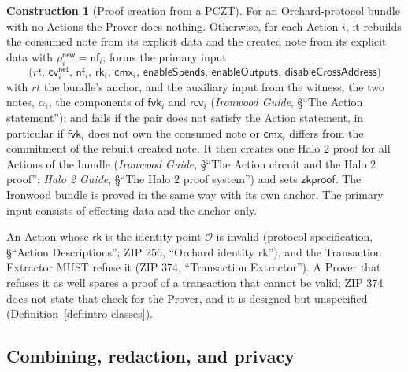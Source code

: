 \documentclass[11pt,a4paper]{article}
\theoremstyle{definition}
\newtheorem{construction}[theorem]{Construction}
\newcommand{\nfsym}{\mathsf{nf}}
\newcommand{\cmx}{\mathsf{cmx}}
\newcommand{\cvsym}{\mathsf{cv}}
\newcommand{\rk}{\mathsf{rk}}
\newcommand{\fvk}{\ensuremath{\mathsf{fvk}}}
\newcommand{\rcv}{\ensuremath{\mathsf{rcv}}}
\begin{document}
\begin{construction}[Proof creation from a PCZT]\label{def:pczt-prove}
For an Orchard-protocol bundle with no Actions the Prover does nothing.
Otherwise, for each Action $i$, it rebuilds the consumed note from its
explicit data and the created note from its explicit data with
$\rho^{\mathsf{new}}_i = \nfsym_i$; forms the primary input
\[
  \bigl(\mathit{rt},\, \cvsym^{\mathsf{net}}_i,\, \nfsym_i,\, \rk_i,\,
  \cmx_i,\, \mathsf{enableSpends},\, \mathsf{enableOutputs},\,
  \mathsf{disableCrossAddress}\bigr)
\]
with $\mathit{rt}$ the bundle's anchor, and the auxiliary input from the
witness, the two notes, $\alpha_i$, the components of $\fvk_i$ and
$\rcv_i$ (\emph{Ironwood Guide}, \S``The Action statement''); and fails if
the pair does not satisfy the Action statement, in particular if $\fvk_i$
does not own the consumed note or $\cmx_i$ differs from the commitment of
the rebuilt created note. It then creates one Halo 2 proof for all Actions
of the bundle (\emph{Ironwood Guide}, \S``The Action circuit and the Halo 2
proof''; \emph{Halo 2 Guide}, \S``The Halo 2 proof system'') and sets
$\mathsf{zkproof}$. The Ironwood bundle is proved in the same way with its
own anchor. The primary input consists of effecting data and the anchor
only.
\end{construction}

An Action whose $\rk$ is the identity point $\mathcal{O}$ is invalid
(protocol specification, \S``Action Descriptions''; ZIP 256, ``Orchard
identity rk''), and the Transaction Extractor MUST refuse it (ZIP 374,
``Transaction Extractor''). A Prover that refuses it as well spares a
proof of a transaction that cannot be valid; ZIP 374 does not state that
check for the Prover, and it is designed but unspecified
(Definition~\ref{def:intro-classes}).

\subsection{Combining, redaction, and privacy}\label{sec:pczt-combine}
\end{document}
